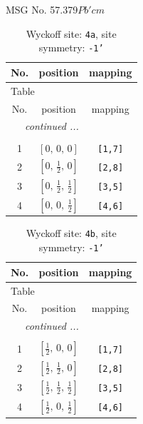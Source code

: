 \documentclass[fleqn,8pt]{jsarticle}
\begin{document}
\setcounter{MaxMatrixCols}{32}

\renewcommand{\tablename}{Table~}
\renewcommand{\figurename}{Figure~}
\begin{center}
\LARGE
MSG No. 57.379\quad$Pb'cm$
\end{center}
\renewcommand{\arraystretch}{1.2}
\begin{longtable}{ccc}
\caption{Wyckoff site: {\tt 4a}, site symmetry: {\tt -1'}}
 \\
 \hline \hline
No. & position & mapping \\ \hline \endfirsthead

\multicolumn{2}{l}{\tablename\ \thetable{}} \\
 \hline \hline
No. & position & mapping \\ \hline \endhead

 \hline \hline
\multicolumn{2}{r}{\footnotesize\it continued ...} \\ \endfoot

 \hline \hline
\multicolumn{2}{r}{} \\ \endlastfoot

1 & $\left[ 0,\, 0,\, 0 \right]$ & {\tt [1,7]} \\ \hline
2 & $\left[ 0,\, \frac{1}{2},\, 0 \right]$ & {\tt [2,8]} \\ \hline
3 & $\left[ 0,\, \frac{1}{2},\, \frac{1}{2} \right]$ & {\tt [3,5]} \\ \hline
4 & $\left[ 0,\, 0,\, \frac{1}{2} \right]$ & {\tt [4,6]} \\
\end{longtable}
\renewcommand{\arraystretch}{1.2}
\begin{longtable}{ccc}
\caption{Wyckoff site: {\tt 4b}, site symmetry: {\tt -1'}}
 \\
 \hline \hline
No. & position & mapping \\ \hline \endfirsthead

\multicolumn{2}{l}{\tablename\ \thetable{}} \\
 \hline \hline
No. & position & mapping \\ \hline \endhead

 \hline \hline
\multicolumn{2}{r}{\footnotesize\it continued ...} \\ \endfoot

 \hline \hline
\multicolumn{2}{r}{} \\ \endlastfoot

1 & $\left[ \frac{1}{2},\, 0,\, 0 \right]$ & {\tt [1,7]} \\ \hline
2 & $\left[ \frac{1}{2},\, \frac{1}{2},\, 0 \right]$ & {\tt [2,8]} \\ \hline
3 & $\left[ \frac{1}{2},\, \frac{1}{2},\, \frac{1}{2} \right]$ & {\tt [3,5]} \\ \hline
4 & $\left[ \frac{1}{2},\, 0,\, \frac{1}{2} \right]$ & {\tt [4,6]} \\
\end{longtable}
\end{document}
